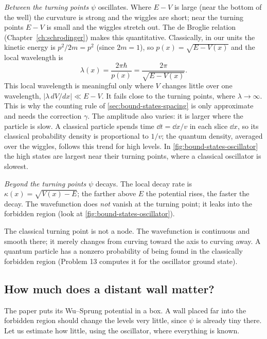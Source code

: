 \emph{Between the turning points} $\psi$ oscillates. Where $E-V$ is large (near the bottom of the well) the curvature is strong and the wiggles are short; near the turning points $E-V$ is small and the wiggles stretch out. The de Broglie relation (Chapter~\ref{ch:schrodinger}) makes this quantitative. Classically, in our units the kinetic energy is $p^2/2m=p^2$ (since $2m=1$), so $p(x)=\sqrt{E-V(x)}$ and the local wavelength is
\begin{equation}
\lambda(x)=\frac{2\pi\hbar}{p(x)}=\frac{2\pi}{\sqrt{E-V(x)}} .
\label{eq:bound-states-lambda}
\end{equation}
This local wavelength is meaningful only where $V$ changes little over one wavelength, $|\lambda\,dV/dx|\ll E-V$. It fails close to the turning points, where $\lambda\to\infty$. This is why the counting rule of \cref{sec:bound-states-spacing} is only approximate and needs the correction $\gamma$. The amplitude also varies: it is larger where the particle is slow. A classical particle spends time $\dd t=\dd x/v$ in each slice $\dd x$, so its classical probability density is proportional to $1/v$; the quantum density, averaged over the wiggles, follows this trend for high levels. In \cref{fig:bound-states-oscillator} the high states are largest near their turning points, where a classical oscillator is slowest.

\emph{Beyond the turning points} $\psi$ decays. The local decay rate is $\kappa(x)=\sqrt{V(x)-E}$; the farther above $E$ the potential rises, the faster the decay. The wavefunction does \emph{not} vanish at the turning point; it leaks into the forbidden region (look at \cref{fig:bound-states-oscillator}).

\begin{pitfall}
The classical turning point is not a node. The wavefunction is continuous and smooth there; it merely changes from curving toward the axis to curving away. A quantum particle has a nonzero probability of being found in the classically forbidden region (Problem 13 computes it for the oscillator ground state).
\end{pitfall}

\subsection{How much does a distant wall matter?}

The paper puts its Wu--Sprung potential in a box. A wall placed far into the forbidden region should change the levels very little, since $\psi$ is already tiny there. Let us estimate how little, using the oscillator, where everything is known.

